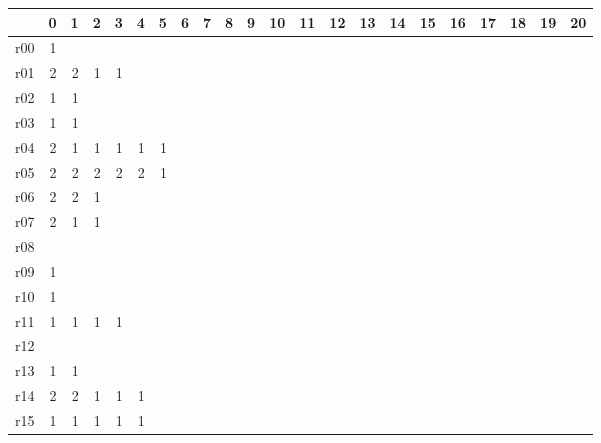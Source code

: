 {\scriptsize
\begin{tabular}{l*{21}{r}} \toprule
& 0& 1& 2& 3& 4& 5& 6& 7& 8& 9& 10& 11& 12& 13& 14& 15& 16& 17& 18& 19& 20\\ \midrule 
r00& \cellcolor{magenta!10} 1& & & & & & & & & & & & & & & & & & & & \\ 
r01& \cellcolor{magenta!10} 2& \cellcolor{magenta!10} 2& \cellcolor{magenta!10} 1& \cellcolor{magenta!10} 1& & & & & & & & & & & & & & & & & \\ 
r02& \cellcolor{magenta!10} 1& \cellcolor{magenta!10} 1& & & & & & & & & & & & & & & & & & & \\ 
r03& \cellcolor{magenta!10} 1& \cellcolor{magenta!10} 1& & & & & & & & & & & & & & & & & & & \\ 
r04& \cellcolor{cyan!10} 2& \cellcolor{cyan!10} 1& \cellcolor{cyan!10} 1& \cellcolor{cyan!10} 1& \cellcolor{cyan!10} 1& \cellcolor{cyan!10} 1& & & & & & & & & & & & & & & \\ 
r05& \cellcolor{magenta!10} 2& \cellcolor{magenta!10} 2& \cellcolor{magenta!10} 2& \cellcolor{magenta!10} 2& \cellcolor{magenta!10} 2& \cellcolor{magenta!10} 1& & & & & & & & & & & & & & & \\ 
r06& \cellcolor{cyan!10} 2& \cellcolor{cyan!10} 2& \cellcolor{cyan!10} 1& & & & & & & & & & & & & & & & & & \\ 
r07& \cellcolor{cyan!10} 2& \cellcolor{cyan!10} 1& \cellcolor{cyan!10} 1& & & & & & & & & & & & & & & & & & \\ 
r08& & & & & & & & & & & & & & & & & & & & & \\ 
r09& \cellcolor{magenta!10} 1& & & & & & & & & & & & & & & & & & & & \\ 
r10& \cellcolor{cyan!10} 1& & & & & & & & & & & & & & & & & & & & \\ 
r11& \cellcolor{magenta!10} 1& \cellcolor{magenta!10} 1& \cellcolor{magenta!10} 1& \cellcolor{magenta!10} 1& & & & & & & & & & & & & & & & & \\ 
r12& & & & & & & & & & & & & & & & & & & & & \\ 
r13& \cellcolor{magenta!10} 1& \cellcolor{magenta!10} 1& & & & & & & & & & & & & & & & & & & \\ 
r14& \cellcolor{cyan!10} 2& \cellcolor{cyan!10} 2& \cellcolor{cyan!10} 1& \cellcolor{cyan!10} 1& \cellcolor{cyan!10} 1& & & & & & & & & & & & & & & & \\ 
r15& \cellcolor{cyan!10} 1& \cellcolor{cyan!10} 1& \cellcolor{cyan!10} 1& \cellcolor{cyan!10} 1& \cellcolor{cyan!10} 1& & & & & & & & & & & & & & & & \\ 

\end{tabular}}
